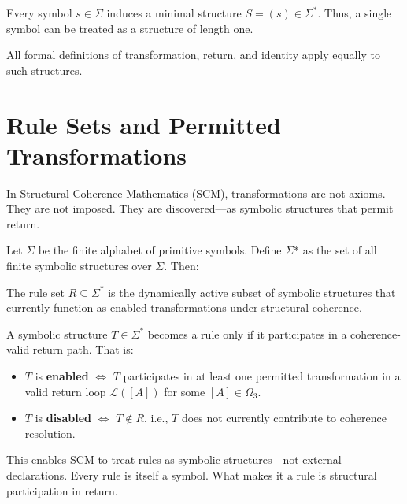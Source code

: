 Every symbol $s \in \Sigma$ induces a minimal structure $S = (s) \in \Sigma^*$.  
Thus, a single symbol can be treated as a structure of length one.

All formal definitions of transformation, return, and identity apply equally to such structures.

\section{Rule Sets and Permitted Transformations}
In Structural Coherence Mathematics (SCM), transformations are not axioms. They are not imposed. They are discovered---as symbolic structures that permit return.

Let $\Sigma$ be the finite alphabet of primitive symbols. Define $\Sigma$* as the set of all finite symbolic structures over $\Sigma$. Then:

\begin{definition} \label{def:rule-set-r}
The rule set $R \subseteq \Sigma^*$ is the dynamically active subset of symbolic structures that currently function as enabled transformations under structural coherence.
\end{definition}

\begin{definition} \label{def:enabled-vs-disabled-rules}
A symbolic structure $T \in \Sigma^*$ becomes a rule only if it participates in a coherence-valid return path. That is:
\begin{itemize}
  \item $T$ is \textbf{enabled} $\iff$ $T$ participates in at least one permitted transformation in a valid return loop $\mathcal{L}([A])$ for some $[A] \in \Omega_3$.
  \item $T$ is \textbf{disabled} $\iff$ $T \notin R$, i.e., $T$ does not currently contribute to coherence resolution.
\end{itemize}
\end{definition}

This enables SCM to treat rules as symbolic structures---not external declarations. Every rule is itself a symbol. What makes it a rule is structural participation in return.


